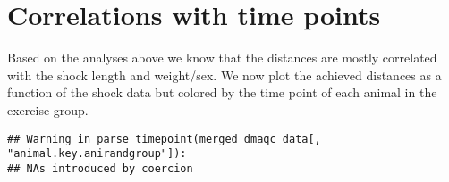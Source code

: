 \documentclass[]{article}
\newenvironment{Shaded}{\begin{snugshade}}{\end{snugshade}}
\newcommand{\KeywordTok}[1]{\textcolor[rgb]{0.13,0.29,0.53}{\textbf{#1}}}
\newcommand{\DataTypeTok}[1]{\textcolor[rgb]{0.13,0.29,0.53}{#1}}
\newcommand{\DecValTok}[1]{\textcolor[rgb]{0.00,0.00,0.81}{#1}}
\newcommand{\StringTok}[1]{\textcolor[rgb]{0.31,0.60,0.02}{#1}}
\newcommand{\CommentTok}[1]{\textcolor[rgb]{0.56,0.35,0.01}{\textit{#1}}}
\newcommand{\ControlFlowTok}[1]{\textcolor[rgb]{0.13,0.29,0.53}{\textbf{#1}}}
\newcommand{\OperatorTok}[1]{\textcolor[rgb]{0.81,0.36,0.00}{\textbf{#1}}}
\newcommand{\NormalTok}[1]{#1}
\begin{document}
\section{Correlations with time
points}\label{correlations-with-time-points}

Based on the analyses above we know that the distances are mostly
correlated with the shock length and weight/sex. We now plot the
achieved distances as a function of the shock data but colored by the
time point of each animal in the exercise group.

\begin{Shaded}
\end{Shaded}

\begin{verbatim}
## Warning in parse_timepoint(merged_dmaqc_data[, "animal.key.anirandgroup"]):
## NAs introduced by coercion
\end{verbatim}
\end{document}

